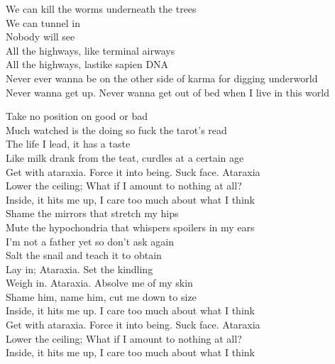We can kill the worms underneath the trees \\
We can tunnel in \\
Nobody will see \\

All the highways, like terminal airways \\
All the highways, lastike sapien DNA \\

Never ever wanna be on the other side of karma for digging underworld \\
Never wanna get up. Never wanna get out of bed when I live in this world \\




Take no position on good or bad \\
Much watched is the doing so fuck the tarot's read \\
The life I lead, it has a taste \\
Like milk drank from the teat, curdles at a certain age \\

Get with ataraxia. Force it into being. Suck face. Ataraxia \\
Lower the ceiling; What if I amount to nothing at all? \\
Inside, it hits me up, I care too much about what I think \\

Shame the mirrors that stretch my hips \\
Mute the hypochondria that whispers spoilers in my ears \\
I'm not a father yet so don't ask again \\
Salt the snail and teach it to obtain \\

Lay in; Ataraxia. Set the kindling \\
Weigh in. Ataraxia. Absolve me of my skin \\
Shame him, name him, cut me down to size \\
Inside, it hits me up. I care too much about what I think \\

Get with ataraxia. Force it into being. Suck face. Ataraxia \\
Lower the ceiling; What if I amount to nothing at all? \\
Inside, it hits me up, I care too much about what I think \\

